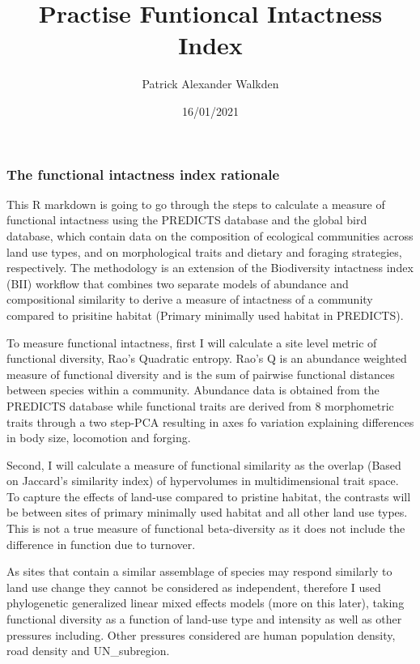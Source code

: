 \documentclass[
]{article}
\title{Practise Funtioncal Intactness Index}
\author{Patrick Alexander Walkden}
\date{16/01/2021}
\begin{document}
\maketitle

\hypertarget{the-functional-intactness-index-rationale}{%
\subsubsection{The functional intactness index
rationale}\label{the-functional-intactness-index-rationale}}

This R markdown is going to go through the steps to calculate a measure
of functional intactness using the PREDICTS database and the global bird
database, which contain data on the composition of ecological
communities across land use types, and on morphological traits and
dietary and foraging strategies, respectively. The methodology is an
extension of the Biodiversity intactness index (BII) workflow that
combines two separate models of abundance and compositional similarity
to derive a measure of intactness of a community compared to prisitine
habitat (Primary minimally used habitat in PREDICTS).

To measure functional intactness, first I will calculate a site level
metric of functional diversity, Rao's Quadratic entropy. Rao's Q is an
abundance weighted measure of functional diversity and is the sum of
pairwise functional distances between species within a community.
Abundance data is obtained from the PREDICTS database while functional
traits are derived from 8 morphometric traits through a two step-PCA
resulting in axes fo variation explaining differences in body size,
locomotion and forging.

Second, I will calculate a measure of functional similarity as the
overlap (Based on Jaccard's similarity index) of hypervolumes in
multidimensional trait space. To capture the effects of land-use
compared to pristine habitat, the contrasts will be between sites of
primary minimally used habitat and all other land use types. This is not
a true measure of functional beta-diversity as it does not include the
difference in function due to turnover.

As sites that contain a similar assemblage of species may respond
similarly to land use change they cannot be considered as independent,
therefore I used phylogenetic generalized linear mixed effects models
(more on this later), taking functional diversity as a function of
land-use type and intensity as well as other pressures including. Other
pressures considered are human population density, road density and
UN\_subregion.
\end{document}
